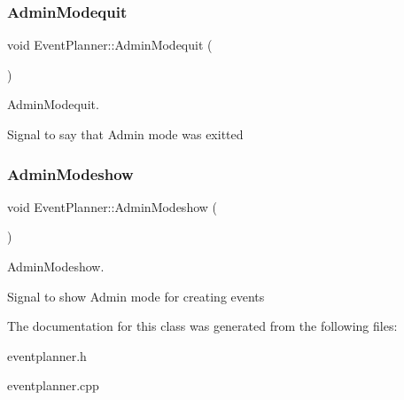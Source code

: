 \subsubsection{\texorpdfstring{Admin\+Modequit}{AdminModequit}}
{\footnotesize\ttfamily void Event\+Planner\+::\+Admin\+Modequit (\begin{DoxyParamCaption}{ }\end{DoxyParamCaption})\hspace{0.3cm}{\ttfamily [signal]}}



Admin\+Modequit. 

Signal to say that Admin mode was exitted \mbox{\label{class_event_planner_ae781e84143069d552b60b7856e7b0ad6}} 
\subsubsection{\texorpdfstring{Admin\+Modeshow}{AdminModeshow}}
{\footnotesize\ttfamily void Event\+Planner\+::\+Admin\+Modeshow (\begin{DoxyParamCaption}{ }\end{DoxyParamCaption})\hspace{0.3cm}{\ttfamily [signal]}}



Admin\+Modeshow. 

Signal to show Admin mode for creating events 

The documentation for this class was generated from the following files\+:\begin{DoxyCompactItemize}
\item 
eventplanner.\+h\item 
eventplanner.\+cpp\end{DoxyCompactItemize}
